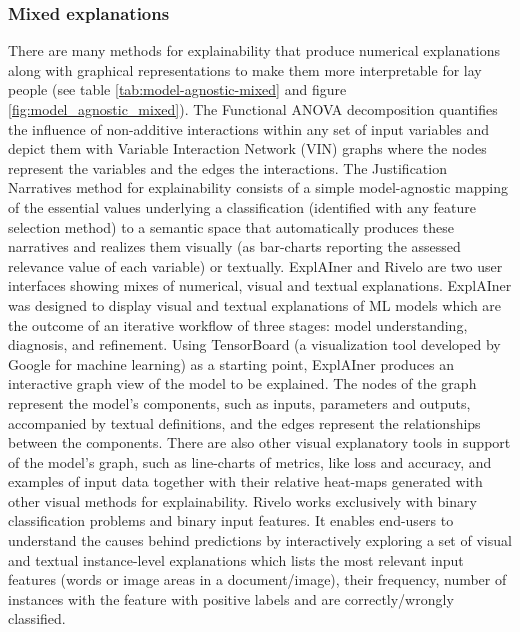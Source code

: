\documentclass[final,1p,times]{elsarticle}
\begin{document}
\subsubsection{Mixed explanations}
There are many methods for explainability that produce numerical explanations along with graphical representations to make them more interpretable for lay people (see table \ref{tab:model-agnostic-mixed} and figure \ref{fig:model_agnostic_mixed}). The Functional ANOVA decomposition \cite{hooker2004discovering} quantifies the influence of non-additive interactions within any set of input variables and depict them with Variable Interaction Network (VIN) graphs where the nodes represent the variables and the edges the interactions.
The Justification Narratives method for explainability \cite{biran2014justification} consists of a simple model-agnostic mapping of the essential values underlying a classification (identified with any feature selection method) to a semantic space that automatically produces these narratives and realizes them visually (as bar-charts reporting the assessed relevance value of each variable) or textually.
ExplAIner \cite{spinner2019explainer} and Rivelo \cite{tamagnini2017interpreting} are two user interfaces showing mixes of numerical, visual and textual explanations. ExplAIner was designed to display visual and textual explanations of ML models which are the outcome of an iterative workflow of three stages: model understanding, diagnosis, and refinement. Using TensorBoard (a visualization tool developed by Google for machine learning) as a starting point, ExplAIner produces an interactive graph view of the model to be explained. The nodes of the graph represent the model's components, such as inputs, parameters and outputs, accompanied by textual definitions, and the edges represent the relationships between the components. There are also other visual explanatory tools in support of the model's graph, such as line-charts of metrics, like loss and accuracy, and examples of input data together with their relative heat-maps generated with other visual methods for explainability.
Rivelo works exclusively with binary classification problems and binary input features. It enables end-users to understand the causes behind predictions by interactively exploring a set of visual and textual instance-level explanations which lists the most relevant input features (words or image areas in a document/image), their frequency, number of instances with the feature with positive labels and are correctly/wrongly classified. \\
\end{document}
